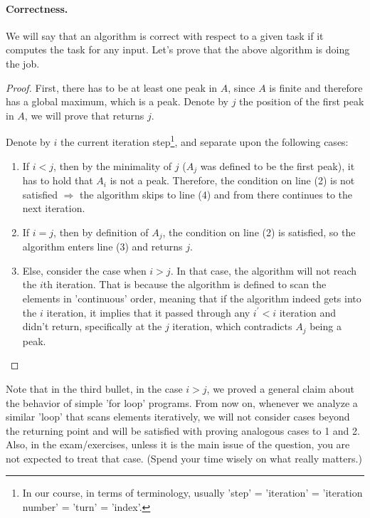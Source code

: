\paragraph{Correctness.}
We will say that an algorithm is correct with respect to a given task if it computes the task for any input. Let's prove that the above algorithm is doing the job.

\begin{proof}
  
First, there has to be at least one peak in $A$, since $A$ is finite and therefore has a global maximum, which is a peak. Denote by $j$ the position of the first peak in $A$, we will prove that  returns $j$. 

  Denote by $i$ the current iteration step\footnote{ In our course, in terms of terminology, usually 'step' = 'iteration' = 'iteration number' = 'turn' = 'index'. }, and separate upon the following cases: 

  \begin{enumerate}
    \item If $i < j$, then by the minimality of $j$ ($A_{j}$ was defined to be the first peak), it has to hold that $A_{i}$ is not a peak. Therefore, the condition on line (2) is not satisfied $ \Rightarrow $ the algorithm skips to line (4) and from there continues to the next iteration.   
    \item If $i = j$, then by definition of $A_{j}$, the condition on line (2) is satisfied, so the algorithm enters line (3) and returns $j$.  
    \item Else, consider the case when $i > j$. In that case, the algorithm will not reach the $i$th iteration. That is because the algorithm is defined to scan the elements in 'continuous' order, meaning that if the algorithm indeed gets into the $i$ iteration, it implies that it passed through any $i^\prime < i$ iteration and didn't return, specifically at the $j$ iteration, which contradicts $A_{j}$ being a peak. 
  \end{enumerate}
\end{proof}
Note that in the third bullet, in the case $i>j$, we proved a general claim about the behavior of simple 'for loop' programs. From now on, whenever we analyze a similar 'loop' that scans elements iteratively, we will not consider cases beyond the returning point and will be satisfied with proving analogous cases to 1 and 2. Also, in the exam/exercises, unless it is the main issue of the question, you are not expected to treat that case. (Spend your time wisely on what really matters.)
